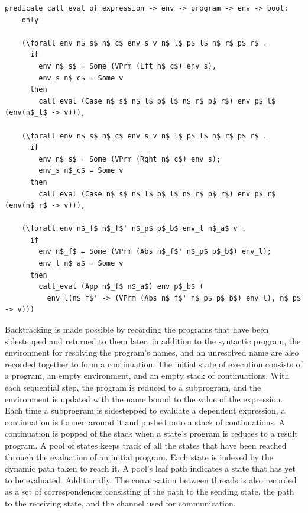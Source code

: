 \documentclass[10pt]{article}
\begin{document}
\begin{lstlisting}[language=logic, mathescape]
  predicate call_eval of expression -> env -> program -> env -> bool:
    only

    (\forall env n$_s$ n$_c$ env_s v n$_l$ p$_l$ n$_r$ p$_r$ .
      if
        env n$_s$ = Some (VPrm (Lft n$_c$) env_s),
        env_s n$_c$ = Some v
      then
        call_eval (Case n$_s$ n$_l$ p$_l$ n$_r$ p$_r$) env p$_l$ (env(n$_l$ -> v))),

    (\forall env n$_s$ n$_c$ env_s v n$_l$ p$_l$ n$_r$ p$_r$ .
      if 
        env n$_s$ = Some (VPrm (Rght n$_c$) env_s); 
        env_s n$_c$ = Some v
      then
        call_eval (Case n$_s$ n$_l$ p$_l$ n$_r$ p$_r$) env p$_r$ (env(n$_r$ -> v))),

    (\forall env n$_f$ n$_f$' n$_p$ p$_b$ env_l n$_a$ v .
      if 
        env n$_f$ = Some (VPrm (Abs n$_f$' n$_p$ p$_b$) env_l); 
        env_l n$_a$ = Some v
      then
        call_eval (App n$_f$ n$_a$) env p$_b$ (
          env_l(n$_f$' -> (VPrm (Abs n$_f$' n$_p$ p$_b$) env_l), n$_p$ -> v)))
  \end{lstlisting}
  

Backtracking is made possible by recording the programs that have been sidestepped and
returned to them later. in addition to the syntactic program, the environment for resolving the
program's names, and an unresolved name are also recorded together to form a continuation. 
The initial state of execution consists of a program, an empty environment, and an empty stack
of continuations. With each sequential step, the program is reduced to a subprogram, and the
environment is updated with the name bound to the value of the expression. Each time a
subprogram is sidestepped to evaluate a dependent expression, a continuation is formed around
it and pushed onto a stack of continuations. A continuation is popped of the stack when a
state's program is reduces to a result program.  A pool of states keeps track of all the states
that have been reached through the evaluation of an initial program.  Each state is indexed by
the dynamic path taken to reach it. A pool's leaf path indicates a state that has yet to be
evaluated. Additionally, The conversation between threads is also recorded as a set of
correspondences consisting of the path to the sending state, the path to the receiving state,
and the channel used for communication.  
\end{document}
